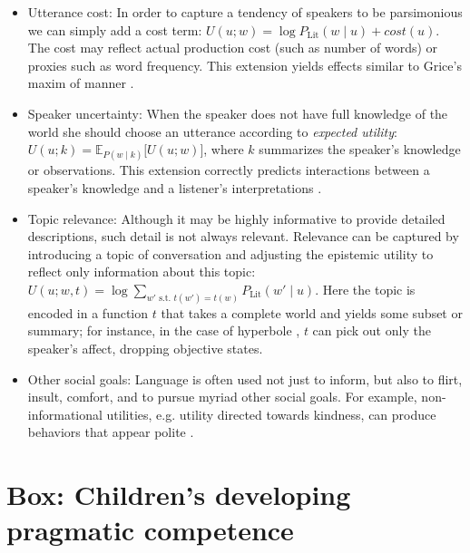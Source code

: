 \documentclass[]{elsarticle}
\begin{document}
\begin{itemize}
\item Utterance cost: In order to capture a tendency of speakers to be
  parsimonious we can simply add a cost term: $U(u; w) =
  \log P_{\text{Lit}}(w\mid u) + cost(u)$. The cost may
  reflect actual production cost (such as number of words) or proxies
  such as word frequency. This extension yields effects similar to
  Grice's maxim of manner \citep{bergen2016}.

\item Speaker uncertainty: When the speaker does not have full knowledge of
  the world she should choose an utterance according to \emph{expected
  utility}: $U(u;k) = {\mathbb E}_{P(w\mid k)}{[}U(u;w){]}$, where $k$
  summarizes the speaker's knowledge or observations. This extension
  correctly predicts interactions between a speaker's knowledge and a
  listener's interpretations \citep{goodman2013}.

\item Topic relevance: Although it may be highly informative to provide detailed descriptions, such detail is not always relevant. Relevance can be captured by introducing a topic of conversation \citep[sometimes known as a \emph{Question Under Discussion,}][]{roberts1996} and adjusting the epistemic utility to reflect only information about this topic: $U(u;w,t)=\log \sum_{w' \text{ s.t. } t(w')=t(w)} P_{\text{Lit}}(w'\mid u)$. Here the topic is encoded in a function $t$ that takes a complete world and yields some subset or summary; for instance, in the case of hyperbole \citep{kao2014}, $t$ can pick out only the speaker's affect, dropping objective states.

\item Other social goals: Language is often used not just to inform, but
  also to flirt, insult, comfort, and to pursue myriad other social
  goals. For example, non-informational utilities, e.g. utility directed towards
  kindness, can produce behaviors that appear polite \citep{yoon2016}.

\end{itemize}

\section{Box: Children's developing pragmatic competence}\label{box-childrens-developing-pragmatic-competence}
\end{document}
